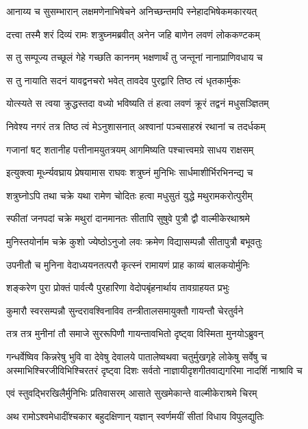 \twolineshloka
{आनाय्य च सुसम्भारान् लक्षमणेनाभिषेचने}
{अनिच्छन्तमपि स्नेहादभिषेकमकारयत्} %

\twolineshloka
{दत्त्वा तस्मै शरं दिव्यं रामः शत्रुघ्नमब्रवीत्}
{अनेन जहि बाणेन लवणं लोककण्टकम्} %

\twolineshloka
{स तु सम्पूज्य तच्छूलं गेहे गच्छति काननम्}
{भक्षणार्थं तु जन्तूनां नानाप्राणिवधाय च} %

\twolineshloka
{स तु नायाति सदनं यावद्वनचरो भवेत्}
{तावदेव पुरद्वारि तिष्ठ त्वं धृतकार्मुकः} %

\twolineshloka
{योत्स्यते स त्वया क्रुद्धस्तदा वध्यो भविष्यति}
{तं हत्वा लवणं क्रूरं तद्वनं मधुसञ्ज्ञितम्} %

\twolineshloka
{निवेश्य नगरं तत्र तिष्ठ त्वं मेऽनुशासनात्}
{अश्वानां पञ्चसाहस्रं रथानां च तदर्धकम्} %

\twolineshloka
{गजानां षट् शतानीह पत्तीनामयुतत्रयम्}
{आगमिष्यति पश्चात्त्वमग्रे साधय राक्षसम्} %

\twolineshloka
{इत्युक्त्वा मूर्ध्न्यवघ्राय प्रेषयामास राघवः}
{शत्रुघ्नं मुनिभिः सार्धमाशीर्भिरभिनन्द्य च} %

\twolineshloka
{शत्रुघ्नोऽपि तथा चक्रे यथा रामेण चोदितः}
{हत्वा मधुसुतं युद्धे मथुरामकरोत्पुरीम्} %

\twolineshloka
{स्फीतां जनपदां चक्रे मथुरां दानमानतः}
{सीतापि सुषुवे पुत्रौ द्वौ वाल्मीकेरथाश्रमे} %

\twolineshloka
{मुनिस्तयोर्नाम चक्रे कुशो ज्येष्ठोऽनुजो लवः}
{क्रमेण विद्यासम्पन्नौ सीतापुत्रौ बभूवतुः} %

\twolineshloka
{उपनीतौ च मुनिना वेदाध्ययनतत्परौ}
{कृत्स्नं रामायणं प्राह काव्यं बालकयोर्मुनिः} %

\twolineshloka
{शङ्करेण पुरा प्रोक्तं पार्वत्यै पुरहारिणा}
{वेदोपबृंहनार्थाय तावग्राहयत प्रभुः} %

\twolineshloka
{कुमारौ स्वरसम्पन्नौ सुन्दरावश्विनाविव}
{तन्त्रीतालसमायुक्तौ गायन्तौ चेरतुर्वने} %

\twolineshloka
{तत्र तत्र मुनीनां तौ समाजे सुररूपिणौ}
{गायन्तावभितो दृष्ट्वा विस्मिता मुनयोऽब्रुवन्} %

\fourlineindentedshloka
{गन्धर्वेष्विव किन्नरेषु भुवि वा देवेषु देवालये}
{पातालेष्वथवा चतुर्मुखगृहे लोकेषु सर्वेषु च}
{अस्माभिश्चिरजीविभिश्चिरतरं दृष्ट्वा दिशः सर्वतो}
{नाज्ञायीदृशगीतवाद्यगरिमा नादर्शि नाश्रावि च} %

\twolineshloka
{एवं स्तुवद्भिरखिलैर्मुनिभिः प्रतिवासरम्}
{आसाते सुखमेकान्ते वाल्मीकेराश्रमे चिरम्} %

\twolineshloka
{अथ रामोऽश्वमेधादींश्चकार बहुदक्षिणान्}
{यज्ञान् स्वर्णमयीं सीतां विधाय विपुलद्युतिः} %


